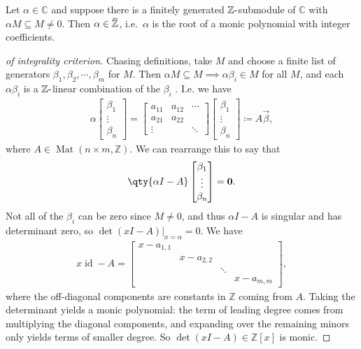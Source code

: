 \begin{proposition}

Let \(\alpha\in {\mathbb{C}}\) and suppose there is a finitely generated
\({\mathbb{Z}}{\hbox{-}}\)submodule of \({\mathbb{C}}\) with
\(\alpha M \subseteq M \neq 0\). Then
\(\alpha\in \mkern 1.5mu\overline{\mkern-1.5mu{\mathbb{Z}}\mkern-1.5mu}\mkern 1.5mu\),
i.e.~\(\alpha\) is the root of a monic polynomial with integer
coefficients.

\end{proposition}

\begin{proof}[of integrality criterion]

Chasing definitions, take \(M\) and choose a finite list of generators
\(\beta_1, \beta_2, \cdots, \beta_m\) for \(M\). Then
\(\alpha M \subseteq M \implies \alpha \beta_i \in M\) for all \(M\),
and each \(\alpha \beta_i\) is a \({\mathbb{Z}}{\hbox{-}}\)linear
combination of the \(\beta_i\) . I.e. we have
\begin{align*}
\alpha 
\begin{bmatrix}
\beta_1 
\\
\vdots  
\\
\beta_n  
\end{bmatrix}
= 
\begin{bmatrix}
a_{11} & a_{12} & \cdots
\\
a_{21} &  a_{22} & 
\\
 \vdots &  &\ddots  
\end{bmatrix}
\begin{bmatrix}
\beta_1 
\\
\vdots  
\\
\beta_n  
\end{bmatrix}
\coloneqq A \vec{\beta}
,\end{align*}
where \(A \in \operatorname{Mat}(n\times m, {\mathbb{Z}})\). We can
rearrange this to say that
\begin{align*}
\qty{ \alpha I - A} 
\begin{bmatrix}
\beta_1 
\\
\vdots  
\\
\beta_n  
\end{bmatrix}
=
\mathbf{0}
.\end{align*}
Not all of the \(\beta_i\) can be zero since \(M\neq 0\), and thus
\(\alpha I - A\) is singular and has determinant zero, so
\(\det(x I - A)\Big|_{x=\alpha} = 0\). We have
\begin{align*}
x\operatorname{id}- A = 
\begin{bmatrix}
x - a_{1,1} &  & &
\\
&  x - a_{2, 2} & & 
\\
&  & \ddots &
\\
& &  & x - a_{m, m}
\end{bmatrix}
,\end{align*}
where the off-diagonal components are constants in \({\mathbb{Z}}\)
coming from \(A\). Taking the determinant yields a monic polynomial: the
term of leading degree comes from multiplying the diagonal components,
and expanding over the remaining minors only yields terms of smaller
degree. So \(\det (x I - A) \in {\mathbb{Z}}[x]\) is monic.


\end{proof}
